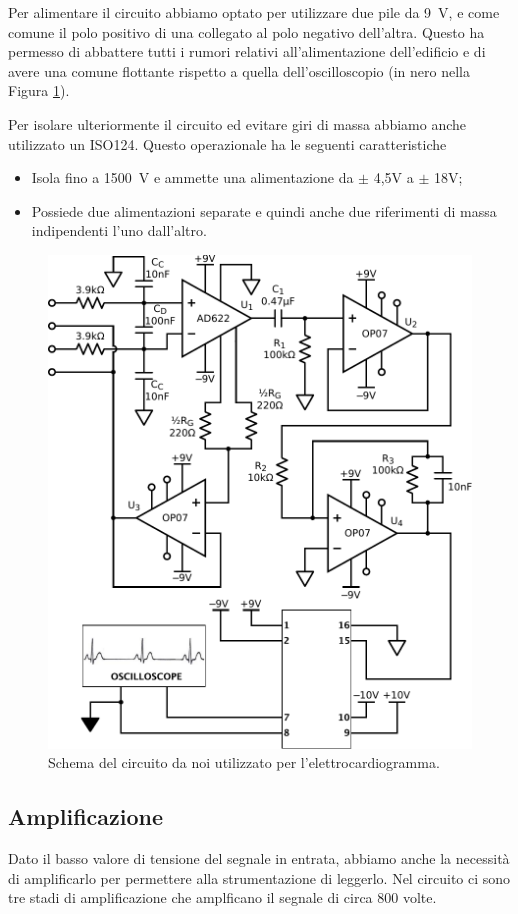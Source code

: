 Per alimentare il circuito abbiamo optato per utilizzare due pile da \SI{9}{\volt}, e come comune il polo positivo di una collegato al polo negativo dell'altra. Questo ha permesso di abbattere tutti i rumori relativi all'alimentazione dell'edificio e di avere una comune flottante rispetto a quella dell'oscilloscopio (in nero nella Figura \ref{cir7:elettro-cardiogramma}).

Per isolare ulteriormente il circuito ed evitare giri di massa abbiamo anche utilizzato un ISO124. Questo operazionale ha le seguenti caratteristiche
\begin{itemize}[noitemsep]
	\item Isola fino a \SI{1500}{\volt} e ammette una alimentazione da $\pm$ 4,5V a $\pm$ 18V;
	\item Possiede due alimentazioni separate e quindi anche due riferimenti di massa indipendenti l'uno dall'altro.
\end{itemize}

\begin{figure}[tpc]
\centering
\includegraphics[width=.6\textwidth]{../E07/latex/circuito.pdf}
\caption{Schema del circuito da noi utilizzato per l'elettrocardiogramma.}
\label{cir7:elettro-cardiogramma}
\end{figure}

\subsection{Amplificazione}

Dato il basso valore di tensione del segnale in entrata, abbiamo anche la necessità di amplificarlo per permettere alla strumentazione di leggerlo. Nel circuito ci sono tre stadi di amplificazione che amplficano il segnale di circa 800 volte.

